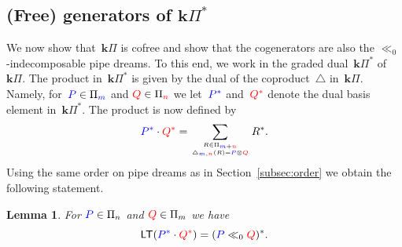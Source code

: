 \documentclass{amsart}
\newtheorem{lemma}[theorem]{Lemma}
\theoremstyle{definition}
\newcommand{\bk}{\mathbf{k}} %
\renewcommand{\b}[1]{{\color{blue} #1}} %
\renewcommand{\r}[1]{{\color{red} #1}} %
\newcommand{\pipeDreams}{\Pi} %
\newcommand{\HP}{{\bk\pipeDreams}} %
\newcommand{\gammainsertion}{\ll}  %
\newcommand{\product}{\cdot} %
\newcommand{\coproduct}{\triangle} %
\newcommand{\leadingTerm}{\mathsf{LT}} %
\begin{document}
 
\subsection{(Free) generators of $\HP^*$}
\label{subsec:generatorsDual}

We now show that~$\HP$ is cofree and show that the cogenerators are also the $\gammainsertion_0$-indecomposable pipe dreams. To this end, we work in the graded dual~$\HP^*$ of~$\HP$. The product in~$\HP^*$ is given by the dual of the coproduct~$\coproduct$ in~$\HP$. Namely, for~$\b{P} \in \pipeDreams_{\b{m}}$ and $\r{Q} \in \pipeDreams_{\r{n}}$ we let~$\b{P^*}$ and~$\r{Q^*}$ denote the dual basis element in~$\HP^*$. The product is now defined by
\[
\b{P^*} \product \r{Q^*} = \sum_{R \in \pipeDreams_{\b{m}+\r{n}} \atop \coproduct_{\b{m},\r{n}}(R) = \b{P} \otimes \r{Q}} R^*.
\]
Using the same order on pipe dreams as in Section~\ref{subsec:order} we obtain the following statement.

\begin{lemma}
For $\b{P}\in\pipeDreams_n$ and  $\r{Q}\in\pipeDreams_m$ we have
\[
\leadingTerm({\b{P^*} \product \r{Q^*}})={(\b{P} \gammainsertion_0 \r{Q})^*}.
\]
\end{lemma}
\end{document}
